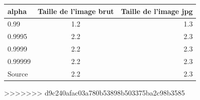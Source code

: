 \documentclass{report}
\begin{document}
			\begin{tabular}{|l|c|r|}
  			\hline
  			alpha & Taille de l'image brut & Taille de l'image jpg \\
  			\hline
  			0.99 & 1.2 & 1.3 \\
  			\hline
  			0.9995 & 2.2 & 2.3 \\
  			\hline
  			0.9999 & 2.2 & 2.3 \\
  			\hline
  			0.99999 & 2.2 & 2.3 \\
  			\hline
  			Source & 2.2 & 2.3 \\
  			\hline
			\end{tabular}
>>>>>>> d9c240afac03a780b53898b503375ba2c98b3585
\end{document}
